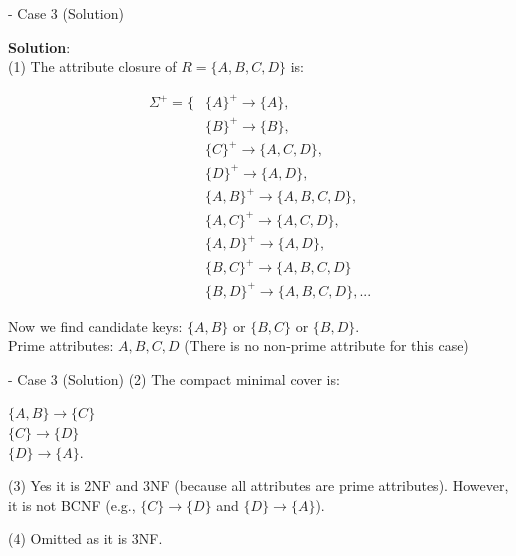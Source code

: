 \begin{frame}[fragile]{ - Case 3 (Solution)}
	
	\textbf{Solution}:\\
	(1) The attribute closure of $R = \{A, B, C, D\}$ is:\\\vspace{5pt}
	\begin{scriptsize}
		\begin{align*} 
			\Sigma^{+} = \{&\{A\}^{+} \rightarrow \{A\},\\
			&\{B\}^{+} \rightarrow \{B\},\\
			&\{C\}^{+} \rightarrow \{A, C, D\},\\
			&\{D\}^{+} \rightarrow \{A, D\},\\
			&\{A, B\}^{+} \rightarrow \{A, B, C, D\},\\
			&\{A, C\}^{+} \rightarrow \{A, C, D\},\\
			&\{A, D\}^{+} \rightarrow \{A, D\},\\
			&\{B, C\}^{+} \rightarrow \{A, B, C, D\}\\
			&\{B, D\}^{+} \rightarrow \{A, B, C, D\}, ...
		\end{align*}
	\end{scriptsize}
	
	Now we find candidate keys: $\{A, B\}$ or $\{B, C\}$ or $\{B, D\}$.\\
	Prime attributes: $A, B, C, D$ (There is no non-prime attribute for this case)
\end{frame}

\begin{frame}[fragile]{ - Case 3 (Solution)}
	(2) The compact minimal cover is:\\\vspace{5pt}
	
	$\{A, B\} \rightarrow \{C\}$\\
	$\{C\} \rightarrow \{D\}$\\
	$\{D\} \rightarrow \{A\}$.\\\vspace{5pt}
	
	(3) Yes it is 2NF and 3NF (because all attributes are prime attributes). However, it is not BCNF (e.g., $\{C\} \rightarrow \{D\}$ and $\{D\} \rightarrow \{A\}$).\\\vspace{5pt}
	
	(4) Omitted as it is 3NF. \\\vspace{5pt}
	
\end{frame}

